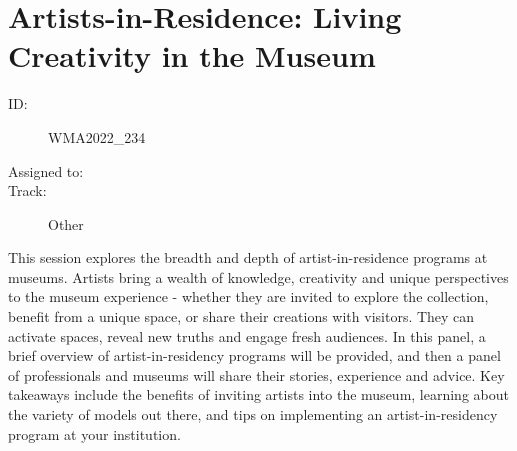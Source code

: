 \documentclass{report}
\begin{document}
              
        
          \newpage
          \section{ Artists-in-Residence: Living Creativity in the Museum }
            \begin{description}
              \item [ID:]
              WMA2022\_234

              \item [Assigned to:]
                \item [Track:]Other~
              \end{description}

              This session explores the breadth and depth of artist-in-residence programs at museums. Artists bring a wealth of knowledge, creativity and unique perspectives to the museum experience - whether they are invited to explore the collection, benefit from a unique space, or share their creations with visitors. They can activate spaces, reveal new truths and engage fresh audiences. In this panel, a brief overview of artist-in-residency programs will be provided, and then a panel of professionals and museums will share their stories, experience and advice. Key takeaways include the benefits of inviting artists into the museum, learning about the variety of models out there, and tips on implementing an artist-in-residency program at your institution.
\end{document}
